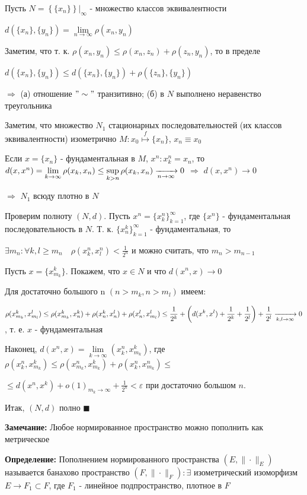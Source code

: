 \documentclass[a4paper]{report}
\newcommand*{\hm}[1]{#1\nobreak\discretionary{}%
            {\hbox{$\mathsurround=0pt #1$}}{}}
\begin{document}
Пусть $N=\left\{\{x_n\}\right\}|_\infty$ - множество классов эквивалентности

$d(\{x_n\},\{y_n\})=\lim\limits_{n\to\infty}\rho(x_n,y_n)$

Заметим, что т. к. $\rho(x_n,y_n)\le\rho(x_n,z_n)+\rho(z_n,y_n)$, то в пределе

$d(\{x_n\},\{y_n\})\le d(\{x_n\},\{y_n\})+\rho(\{z_n\},\{y_n\})$

$\Rightarrow$ (а) отношение $"\sim"$ транзитивно; (б) в $N$ выполнено неравенство треугольника

Заметим, что множество $N_1$ стационарных последовательностей (их классов эквивалентности) изометрично $M\colon
x_0\stackrel{f}{\longmapsto}\{x_n\}$, $x_n\equiv x_0$

Если $x=\{x_n\}$ - фундаментальная в $M$, $x^n\colon x_k^n=x_n$, то $d(x,x^n)\hm=\lim\limits_{k\to\infty}\rho(x_k,x_n)\le
\sup\limits_{k>n}\rho(x_k,x_n)\xrightarrow[n\to\infty]{}0$ $\Rightarrow$ $d(x,x^n)\to0$

$\Rightarrow$ $N_1$ всюду плотно в $N$

Проверим полноту $(N,d)$. Пусть $x^n=\{x_k^n\}_{k=1}^\infty$, где $\{x^n\}$ - фундаментальная последовательность в $N$.
Т. к. $\{x_n^k\}_{k=1}^\infty$ - фундаментальная, то

 $\exists m_n\colon\forall k,l\ge m_n\quad\rho(x_k^n,x_l^n)<\displaystyle\frac{1}{2^n}$
и можно считать, что $m_n>m_{n-1}$

Пусть $x=\{x_{m_k}^k\}$. Покажем, что $x\in N$ и что $d(x^n,x)\to0$

Для достаточно большого n $(n>m_k,n>m_l)$ имеем:

$\rho(x_{m_k}^k,x_{m_l}^l)\le\rho(x_{m_k}^k,x_n^k)+\rho(x_n^k,x_n^l)+\rho(x_n^l,x_{m_l}^l)\displaystyle\le\frac{1}{2^k}+\left(d(x^k,x^l)+
\displaystyle\frac{1}{2^k}+\frac{1}{2^l}\right)\hm+\displaystyle\frac{1}{2^l}\xrightarrow[k,l\to\infty]{}0$, т. е. $x$ - фундаментальная

Наконец, $d(x^n,x)=\lim\limits_{k\to\infty}(x_k^n,x_{m_k}^k)$, где $\rho(x_k^n,x_{m_k}^k)\le\rho(x_{m_k}^n,x_{m_k}^k)+
\rho(x_k^n,x_{m_k}^n)\le$

\noindent$\le d(x^n,x^k)+o(1)_{m_k\to\infty}+\displaystyle\frac{1}{2^n}<\varepsilon$ при достаточно большом $n$.

Итак, $(N,d)$ полно $\blacksquare$
\bigskip

\noindent\textbf{Замечание:} Любое нормированное пространство можно пополнить как метрическое
\bigskip

\noindent\textbf{Определение:} Пополнением нормированного пространства $(E,\|\cdot\|_E)$ называется банахово пространство
$(F,\|\cdot\|_F)\colon\exists$ изометрический изоморфизм $E\to F_1\subset F$, где $F_1$ - линейное подпространство,
плотное в $F$
\bigskip
\end{document}
